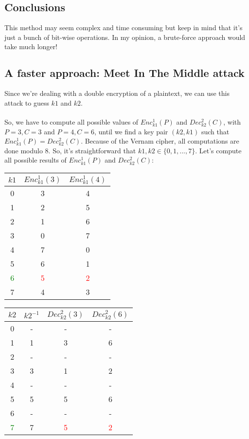 \subsection{Conclusions}
This method may seem complex and time consuming but keep in mind that it's just a bunch of bit-wise operations. In my opinion, a brute-force approach would take much longer!

\hypertarget{link1}{\subsection{A faster approach: Meet In The Middle attack}}
Since we're dealing with a double encryption of a plaintext, we can use this attack to guess $k1$ and $k2$.\\\\
So, we have to compute all possible values of $Enc^1_{k1}(P)$ and $Dec^2_{k2}(C)$, with $P=3,C=3$ and $P=4,C=6$, until we find a key pair $(k2,k1)$ such that $Enc^1_{k1}(P)=Dec^2_{k2}(C)$. Because of the Vernam cipher, all computations are done modulo 8. So, it's straightforward that $k1,k2\in\{0,1,...,7\}$. Let's compute all possible results of $Enc^1_{k1}(P)$ and $Dec^2_{k2}(C)$:
\begin{center}
    \begin{tabular}{|c|c|c|}
        \hline
        $k1$&$Enc^1_{k1}(3)$&$Enc^1_{k1}(4)$\\
        \hline
        0&3&4\\
        1&2&5\\
        2&1&6\\
        3&0&7\\
        4&7&0\\
        5&6&1\\
        \textcolor{Green}{6}&\textcolor{red}{5}&\textcolor{red}{2}\\
        7&4&3\\
        \hline
    \end{tabular}\qquad
    \begin{tabular}{|c|c|c|c|}
        \hline
        $k2$&$k2^{-1}$&$Dec^2_{k2}(3)$&$Dec^2_{k2}(6)$\\
        \hline
        0&-&-&-\\
        1&1&3&6\\
        2&-&-&-\\
        3&3&1&2\\
        4&-&-&-\\
        5&5&5&6\\
        6&-&-&-\\
        \textcolor{Green}{7}&7&\textcolor{red}{5}&\textcolor{red}{2}\\
        \hline
    \end{tabular}
\end{center}
